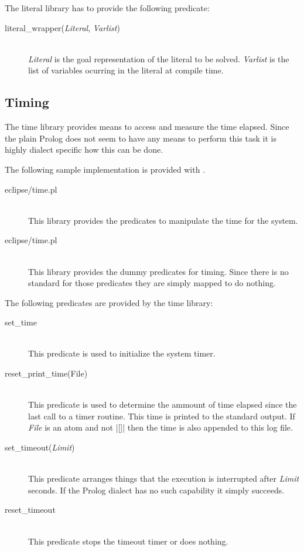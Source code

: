 The literal library has to provide the following predicate:
\begin{description}
  \item [literal\_wrapper({\em Literal}, {\em Varlist})]\ \\
    {\em Literal}\/ is the goal representation of the literal to be
    solved. {\em Varlist}\/ is the list of variables ocurring in the literal
    at compile time.
\end{description}


\subsection{Timing}\label{sec:timing}

The time library provides means to access and measure the time elapsed. Since
the plain Prolog does not seem to have any means to perform this task it is
highly dialect specific how this can be done.

The following sample implementation is provided with \ProCom.
\begin{description}
  \item [eclipse/time.pl]\ 
    \\
    This library provides the predicates to manipulate the time for the
    \eclipse{} system.
  \item [eclipse/time.pl]\ 
    \\
    This library provides the dummy predicates for timing. Since there is no
    standard for those predicates they are simply mapped to do nothing.
\end{description}

The following predicates are provided by the time library:

\begin{description}
  \item [set\_time]\ 
    \\
    This predicate is used to initialize the system timer.
  \item [reset\_print\_time(File)]\ 
    \\
    This predicate is used to determine the ammount of time elapsed since the
    last call to a timer routine. This time is printed to the standard output.
    If {\em File} is an atom and not |[]| then the time is also appended to
    this log file.
  \item [set\_timeout({\em Limit})]\index{set\_timeout}\ 
    \\
    This predicate arranges things that the execution is interrupted after
    {\em Limit} seconds. If the Prolog dialect has no such capability it
    simply succeeds.
  \item [reset\_timeout]\index{reset\_timeout}\ 
    \\
    This predicate stops the timeout timer or does nothing.
\end{description}


